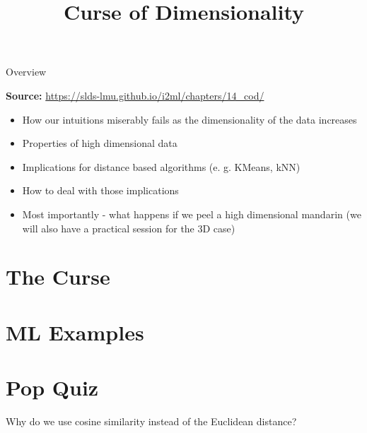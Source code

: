 \documentclass{beamer}
\title{Curse of Dimensionality}
\begin{document}

\begin{frame}{Overview}

\textbf{Source: } \url{https://slds-lmu.github.io/i2ml/chapters/14_cod/}

\begin{itemize}
    \item How our intuitions miserably fails as the dimensionality of the data increases
    \item Properties of high dimensional data
    \item Implications for distance based algorithms (e. g. KMeans, kNN)
    \item How to deal with those implications
    \item Most importantly - what happens if we peel a high dimensional mandarin (we will also have a practical session for the 3D case)
\end{itemize}
\end{frame}


\section{The Curse}


\section{ML Examples}


\section{Pop Quiz}
\begin{frame}
    Why do we use cosine similarity instead of the Euclidean distance?
\end{frame}
\end{document}
